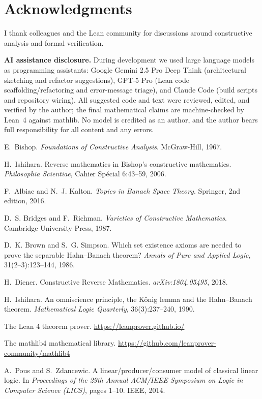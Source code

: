 \documentclass[11pt]{article}
\begin{document}
\section*{Acknowledgments}

I thank colleagues and the Lean community for discussions around constructive analysis and formal verification.

\smallskip
\noindent\textbf{AI assistance disclosure.} During development we used large language models as programming assistants: Google Gemini 2.5 Pro Deep Think (architectural sketching and refactor suggestions), GPT-5 Pro (Lean code scaffolding/refactoring and error-message triage), and Claude Code (build scripts and repository wiring). All suggested code and text were reviewed, edited, and verified by the author; the final mathematical claims are machine-checked by Lean~4 against mathlib. No model is credited as an author, and the author bears full responsibility for all content and any errors.


\begin{thebibliography}{10}

E.~Bishop.
\newblock \emph{Foundations of Constructive Analysis}.
\newblock McGraw-Hill, 1967.

H.~Ishihara.
\newblock Reverse mathematics in Bishop's constructive mathematics.
\newblock \emph{Philosophia Scientiae}, Cahier Sp\'ecial 6:43--59, 2006.

F.~Albiac and N.~J. Kalton.
\newblock \emph{Topics in Banach Space Theory}.
\newblock Springer, 2nd edition, 2016.

D.~S. Bridges and F.~Richman.
\newblock \emph{Varieties of Constructive Mathematics}.
\newblock Cambridge University Press, 1987.

D.~K. Brown and S.~G. Simpson.
\newblock Which set existence axioms are needed to prove the separable Hahn--Banach theorem?
\newblock \emph{Annals of Pure and Applied Logic}, 31(2--3):123--144, 1986.

H.~Diener.
\newblock Constructive Reverse Mathematics.
\newblock \emph{arXiv:1804.05495}, 2018.

H.~Ishihara.
\newblock An omniscience principle, the K\"onig lemma and the Hahn--Banach theorem.
\newblock \emph{Mathematical Logic Quarterly}, 36(3):237--240, 1990.

The Lean 4 theorem prover.
\newblock \url{https://leanprover.github.io/}

The mathlib4 mathematical library.
\newblock \url{https://github.com/leanprover-community/mathlib4}

A.~Pous and S.~Zdancewic.
\newblock A linear/producer/consumer model of classical linear logic.
\newblock In \emph{Proceedings of the 29th Annual ACM/IEEE Symposium on Logic in Computer Science (LICS)}, pages 1--10. IEEE, 2014.

\end{thebibliography}
\end{document}
